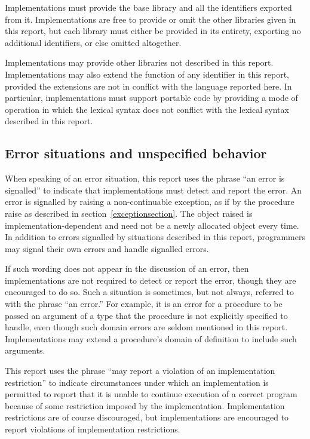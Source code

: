Implementations must provide the {\cf base} library and all the identifiers
exported from it.  Implementations are free to provide or omit the other
libraries given in this report, but each library must either be provided
in its entirety, exporting no additional identifiers, or else omitted
altogether.

Implementations may provide other libraries not described in this report.
Implementations may also extend the function of any identifier in this
report, provided the extensions are not in conflict with the language
reported here.  In particular, implementations must support portable
code by providing a mode of operation in which the lexical syntax does
not conflict with the lexical syntax described in this report.

\subsection{Error situations and unspecified behavior}

When speaking of an error situation, this report uses the phrase ``an
error is signalled'' to indicate that implementations must detect and
report the error.
An error is signalled by raising a non-continuable exception, as if by
the procedure {\cf raise} as described in section~\ref{exceptionsection}.  The object raised is implementation-dependent
and need not be a newly allocated object every time.
In addition to errors signalled by situations described in this
report, programmers may signal their own errors and handle signalled errors.


\vest If such wording does not appear in the discussion of
an error, then implementations are not required to detect or report the
error, though they are encouraged to do so.
Such a situation is sometimes, but not always, referred to with the phrase
``an error.''
For example, it is an error for a procedure to be passed an argument of a type that
the procedure is not explicitly specified to handle, even though such
domain errors are seldom mentioned in this report.  Implementations may
extend a procedure's domain of definition to include such arguments.

\vest This report uses the phrase ``may report a violation of an
implementation restriction'' to indicate circumstances under which an
implementation is permitted to report that it is unable to continue
execution of a correct program because of some restriction imposed by the
implementation.  Implementation restrictions are of course discouraged,
but implementations are encouraged to report violations of implementation
restrictions.

